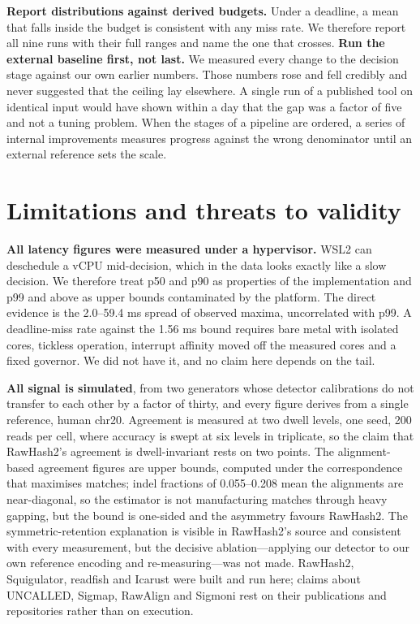 \documentclass[conference]{IEEEtran}
\begin{document}
\textbf{Report distributions against derived budgets.} Under a deadline, a mean that falls
inside the budget is consistent with any miss rate. We therefore report all nine runs with their
full ranges and name the one that crosses. \textbf{Run the external baseline first, not last.}
We measured every change to the decision stage against our own earlier numbers. Those numbers
rose and fell credibly and never suggested that the ceiling lay elsewhere. A single run of a
published tool on identical input would have shown within a day that the gap was a factor of
five and not a tuning problem. When the stages of a pipeline are ordered, a series of internal
improvements measures progress against the wrong denominator until an external reference sets
the scale.

\section{Limitations and threats to validity}
\label{sec:limits}

\textbf{All latency figures were measured under a hypervisor.} WSL2 can deschedule a vCPU
mid-decision, which in the data looks exactly like a slow decision. We therefore treat p50 and
p90 as properties of the implementation and p99 and above as upper bounds contaminated by the
platform. The direct evidence is the 2.0--59.4 ms spread of observed maxima, uncorrelated with
p99. A deadline-miss rate against the 1.56 ms bound requires bare metal with isolated
cores, tickless operation, interrupt affinity moved off the measured cores and a fixed
governor. We did not have it, and no claim here depends on the tail.

\textbf{All signal is simulated}, from two generators whose detector calibrations do not
transfer to each other by a factor of thirty, and every figure derives from a single
reference, human chr20. Agreement is measured at two dwell levels, one seed, 200 reads per
cell, where accuracy is swept at six levels in triplicate, so the claim that RawHash2's
agreement is dwell-invariant rests on two points. The alignment-based agreement figures are
upper bounds, computed under the correspondence that maximises matches; indel fractions of
0.055--0.208 mean the alignments are near-diagonal, so the estimator is not manufacturing
matches through heavy gapping, but the bound is one-sided and the asymmetry favours RawHash2.
The symmetric-retention explanation is visible in RawHash2's source and consistent with every
measurement, but the decisive ablation---applying our detector to our own reference encoding
and re-measuring---was not made. RawHash2, Squigulator, readfish and Icarust were built and
run here; claims about UNCALLED, Sigmap, RawAlign and Sigmoni rest on their publications and
repositories rather than on execution.
\end{document}
